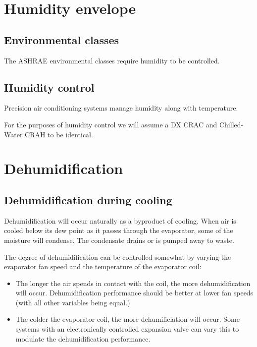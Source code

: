 \documentclass{pgnotes}
\begin{document}
\section{Humidity envelope}

\subsection{Environmental classes}

The ASHRAE environmental classes require humidity to be controlled.



\subsection{Humidity control}

Precision air conditioning systems manage humidity along with temperature.

For the purposes of humidity control we will assume a DX CRAC and Chilled-Water CRAH to be identical.

\section{Dehumidification}
\label{sec:dehumidification}

\subsection{Dehumidification during cooling}
\label{sec:dehumidification-during-cooling}

Dehumidification will occur naturally as a byproduct of cooling.
When air is cooled below its dew point as it passes through the evaporator, some of the moisture will condense.
The condensate drains or is pumped away to waste.

The degree of dehumidification can be controlled somewhat by varying the evaporator fan speed and the temperature of the evaporator coil:
\begin{itemize}
\item
  The longer the air spends in contact with the coil, the more dehumidification will occur.
  Dehumidification performance should be better at lower fan speeds (with all other variables being equal.)
\item
  The colder the evaporator coil, the more dehumificiation will occur.
  Some systems with an electronically controlled expansion valve can vary this to modulate the dehumidification performance.
\end{itemize}
\end{document}
